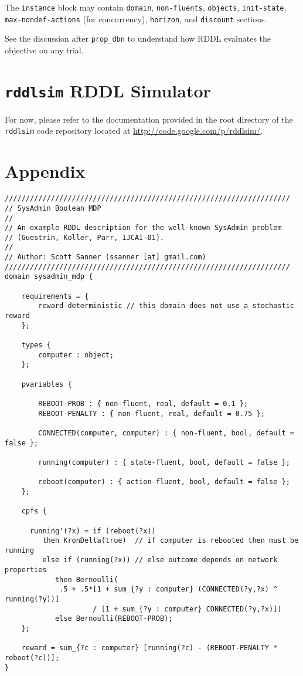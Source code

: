 \documentclass[11pt,a4paper]{article}
\begin{document}
The \texttt{instance} block may contain 
\texttt{domain}, \texttt{non-fluents}, \texttt{objects}, 
\texttt{init-state},\\ \texttt{max-nondef-actions} (for concurrency), 
\texttt{horizon}, and \texttt{discount} sections.

See the discussion after \texttt{prop\_dbn} to understand how RDDL
evaluates the objective on any trial.

\section{\texttt{rddlsim} RDDL Simulator}

For now, please refer to the documentation provided in the
root directory of the \texttt{rddlsim} code repository
located at \url{http://code.google.com/p/rddlsim/}.

 


\COMMENT

\ENDCOMMENT

\section*{Appendix}

\begin{lstlisting}[title=sysadmin\_mdp.rddl]
////////////////////////////////////////////////////////////////////
// SysAdmin Boolean MDP 
//
// An example RDDL description for the well-known SysAdmin problem
// (Guestrin, Koller, Parr, IJCAI-01).
//
// Author: Scott Sanner (ssanner [at] gmail.com)
////////////////////////////////////////////////////////////////////
domain sysadmin_mdp {
  
	requirements = { 
		reward-deterministic // this domain does not use a stochastic reward
	};
	
	types {
  		computer : object;
	};
      
	pvariables { 
    		  		    		  		
		REBOOT-PROB : { non-fluent, real, default = 0.1 };
		REBOOT-PENALTY : { non-fluent, real, default = 0.75 };

		CONNECTED(computer, computer) : { non-fluent, bool, default = false };

		running(computer) : { state-fluent, bool, default = false };
      
		reboot(computer) : { action-fluent, bool, default = false }; 
	};
	
	cpfs {
  
	  running'(?x) = if (reboot(?x))
		 then KronDelta(true)  // if computer is rebooted then must be running 
		 else if (running(?x)) // else outcome depends on network properties
		    then Bernoulli(
             .5 + .5*[1 + sum_{?y : computer} (CONNECTED(?y,?x) ^ running(?y))] 
		             / [1 + sum_{?y : computer} CONNECTED(?y,?x)])
		    else Bernoulli(REBOOT-PROB); 
	};
  
	reward = sum_{?c : computer} [running(?c) - (REBOOT-PENALTY * reboot(?c))];
}
\end{lstlisting}
\end{document}
